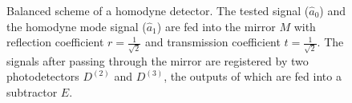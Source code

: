\begin{figure}
\centering



\caption{Balanced scheme of a homodyne detector. The tested signal
  ($\hat{a}_0$) and the homodyne mode signal ($\hat{a}_1$) are fed into
  the mirror $M$ with reflection coefficient $r=\frac{1}{\sqrt{2}}$ and
  transmission coefficient $t=\frac{1}{\sqrt{2}}$. The signals after passing
  through the mirror are registered by two photodetectors $D^{(2)}$ and $D^{(3)}$,
  the outputs of which are fed into a subtractor $E$.}
\label{figPart3Squeezed_13}
\end{figure}